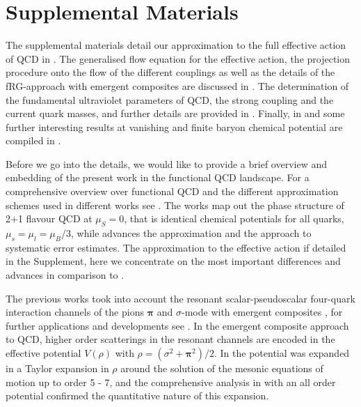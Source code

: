 \documentclass[reprint,twocolumn,superscriptaddress,preprintnumbers,amsmath,amssymb,aps,prd,floatfix]{revtex4-2}
\begin{document}
\onecolumngrid

	

\section*{Supplemental Materials}

The supplemental materials detail our approximation to the full effective action of QCD in . The generalised flow equation for the effective action, the projection procedure onto the flow of the different couplings as well as the details of the fRG-approach with emergent composites are discussed in . The determination of the fundamental ultraviolet parameters of QCD, the strong coupling and the current quark masses, and further details are provided in . Finally, in and some further interesting results at vanishing and finite baryon chemical potential are compiled in . 

Before we go into the details, we would like to provide a brief overview and embedding of the present work in the functional QCD landscape. For a comprehensive overview over functional QCD and the different approximation schemes used in different works see \cite{Fischer:2026uni}. The works \cite{Fu:2019hdw, Ihssen:2024miv, Pawlowski:2025jpg} map out the phase structure of 2+1 flavour QCD at $\mu_S=0$, that is identical chemical potentials for all quarks, $\mu_s= \mu_l=\mu_B/3$, while \cite{Ihssen:2024miv} advances the approximation and the approach to systematic error estimates.  The approximation to the effective action if detailed in the Supplement, here we concentrate on the most important differences and advances in comparison to \cite{Fu:2019hdw, Fu:2024rto, Ihssen:2024miv, Pawlowski:2025jpg}.  

The previous works took into account the resonant scalar-pseudoscalar four-quark interaction channels of the pions $\boldsymbol{\pi}$ and $\sigma$-mode with emergent composites \cite{Gies:2001nw, Gies:2002hq, Pawlowski:2005xe, Fu:2019hdw, Fukushima:2021ctq}, for further applications and developments see \cite{Mitter:2014wpa, Braun:2014ata, Rennecke:2015eba, Cyrol:2017qkl}. In the emergent composite approach to QCD, higher order scatterings in the resonant channels are encoded in the effective potential $V(\rho)$ with $\rho= (\sigma^2 +\boldsymbol{\pi}^2)/2$. In \cite{Fu:2019hdw, Fu:2024rto} the potential was expanded in a Taylor expansion in $\rho$ around the solution of the mesonic equations of motion up to order 5 - 7, and the comprehensive analysis in \cite{Ihssen:2024miv} with an all order potential confirmed the quantitative nature of this expansion.  
\end{document}
